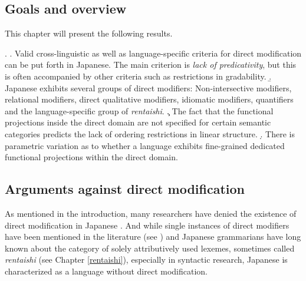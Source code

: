 \documentclass [output=book,colorlinks,citecolor=brown]{langscibook}
\begin{document}
\newpage

\subsection{Goals and overview}

This chapter will present the following results.

\ex. \a. Valid cross-linguistic as well as language-specific criteria for direct modification can be put forth in Japanese. The main criterion is \textit{lack of predicativity}, but this is often accompanied by other criteria such as restrictions in gradability.
\b. Japanese exhibits several groups of direct modifiers: Non-intersective modifiers, relational modifiers, direct qualitative modifiers, idiomatic modifiers, quantifiers and the language-specific group of \textit{rentaishi}.
\c. The fact that the functional projections inside the direct domain are not specified for certain semantic categories predicts the lack of ordering restrictions in linear structure.
\d. There is parametric variation as to whether a language exhibits fine-grained dedicated functional projections within the direct domain.

\subsection{Arguments against direct modification}

As mentioned in the introduction, many researchers have denied the existence of direct modification in Japanese \citep{kuno:1973:structure, hinds:1988:japanese, whitman:1981:internal, kaplan:1995:the, sproat:1991:the, baker:2003:verbal, laenzlinger:2011:elements}. And while single instances of direct modifiers have been mentioned in the literature (see \citealt{watanabe:2017:attributive}) and Japanese grammarians have long known about the category of solely attributively used lexemes, sometimes called \textit{rentaishi} (see Chapter \ref{rentaishi}), especially in syntactic research, Japanese is characterized as a language without direct modification.
\end{document}
